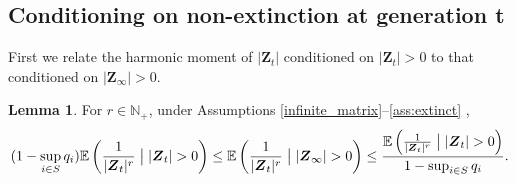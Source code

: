 \documentclass[preprint,3p,12pt]{elsarticle}
\theoremstyle{definition}
\newtheorem{lemma}{Lemma}
\newcommand{\assumptionsHS}{%
 \ref{infinite_matrix}--\ref{ass:extinct}
}
\begin{document}
\subsection{Conditioning on non-extinction at generation t}
First we relate the harmonic moment of $|\boldsymbol{Z}_t|$ conditioned on $|\boldsymbol{Z}_t| >0$ to that conditioned on $|\boldsymbol{Z}_{\infty}| > 0$.
\begin{lemma}\label{t_and_infinity}
For $r \in \mathbb{N}_+$, under Assumptions \assumptionsHS,
\begin{equation*}
   (1-\sup_{i \in S}q_i) \mathbb{E}\left(\frac{1}{|\boldsymbol{Z}_t|^{r}}\bigm| |\boldsymbol{Z}_{t}|>0\right) \le \mathbb{E}\left(\frac{1}{|\boldsymbol{Z}_t|^{r}}\bigm| |\boldsymbol{Z}_{\infty}|>0\right)\le \frac{\mathbb{E}\left(\frac{1}{|\boldsymbol{Z}_t|^r}\bigm| |\boldsymbol{Z}_t| >0\right)}{1 - \sup_{i \in S}q_i}.  \label{infinity_vs_t}
\end{equation*}
\end{lemma}
\end{document}
